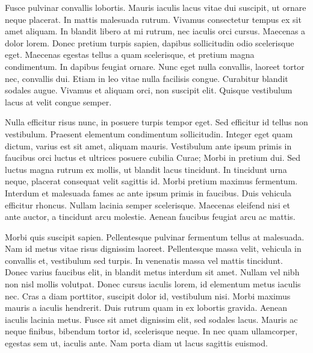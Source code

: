\documentclass[a4paper,11pt]{article}
\begin{document}
\begin{mlsolution}
Fusce pulvinar convallis lobortis. Mauris iaculis lacus vitae dui suscipit, ut ornare neque placerat. In mattis malesuada rutrum. Vivamus consectetur tempus ex sit amet aliquam. In blandit libero at mi rutrum, nec iaculis orci cursus. Maecenas a dolor lorem. Donec pretium turpis sapien, dapibus sollicitudin odio scelerisque eget. Maecenas egestas tellus a quam scelerisque, et pretium magna condimentum. In dapibus feugiat ornare. Nunc eget nulla convallis, laoreet tortor nec, convallis dui. Etiam in leo vitae nulla facilisis congue. Curabitur blandit sodales augue. Vivamus et aliquam orci, non suscipit elit. Quisque vestibulum lacus at velit congue semper.

Nulla efficitur risus nunc, in posuere turpis tempor eget. Sed efficitur id tellus non vestibulum. Praesent elementum condimentum sollicitudin. Integer eget quam dictum, varius est sit amet, aliquam mauris. Vestibulum ante ipsum primis in faucibus orci luctus et ultrices posuere cubilia Curae; Morbi in pretium dui. Sed luctus magna rutrum ex mollis, ut blandit lacus tincidunt. In tincidunt urna neque, placerat consequat velit sagittis id. Morbi pretium maximus fermentum. Interdum et malesuada fames ac ante ipsum primis in faucibus. Duis vehicula efficitur rhoncus. Nullam lacinia semper scelerisque. Maecenas eleifend nisi et ante auctor, a tincidunt arcu molestie. Aenean faucibus feugiat arcu ac mattis.

Morbi quis suscipit sapien. Pellentesque pulvinar fermentum tellus at malesuada. Nam id metus vitae risus dignissim laoreet. Pellentesque massa velit, vehicula in convallis et, vestibulum sed turpis. In venenatis massa vel mattis tincidunt. Donec varius faucibus elit, in blandit metus interdum sit amet. Nullam vel nibh non nisl mollis volutpat. Donec cursus iaculis lorem, id elementum metus iaculis nec. Cras a diam porttitor, suscipit dolor id, vestibulum nisi. Morbi maximus mauris a iaculis hendrerit. Duis rutrum quam in ex lobortis gravida. Aenean iaculis lacinia metus. Fusce sit amet dignissim elit, sed sodales lacus. Mauris ac neque finibus, bibendum tortor id, scelerisque neque. In nec quam ullamcorper, egestas sem ut, iaculis ante. Nam porta diam ut lacus sagittis euismod. 
\end{mlsolution}
\end{document}

